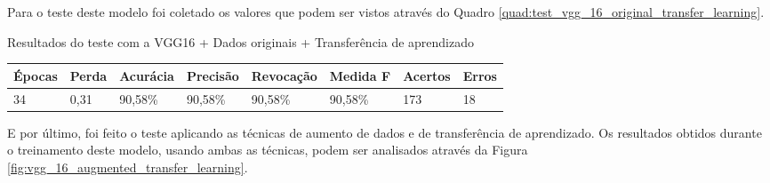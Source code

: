 \documentclass[
	12pt,				%
	oneside,			%
	a4paper,			%
	english,			%
	brazil				%
	]{abntex2ppgsi}
\begin{document}
Para o teste deste modelo foi coletado os valores que podem ser vistos através do Quadro \ref{quad:test_vgg_16_original_transfer_learning}.

\begin{quadro}[H]
\caption{Resultados do teste com a VGG16 + Dados originais + Transferência de aprendizado}
\label{quad:test_vgg_16_original_transfer_learning}
\centering
\begin{tabular}{|l|l|l|l|l|l|l|l|}
\cline{1-8}
Épocas & Perda & Acurácia & Precisão & Revocação & Medida F & Acertos & Erros \\ \hline
34 & 0,31 & 90,58\% & 90,58\% & 90,58\% & 90,58\% & 173 & 18 \\
\cline{1-8}
\end{tabular}
\end{quadro}

E por último, foi feito o teste aplicando as técnicas de aumento de dados e de transferência de aprendizado. Os resultados obtidos durante o treinamento deste modelo, usando ambas as técnicas, podem ser analisados através da Figura \ref{fig:vgg_16_augmented_transfer_learning}.
\end{document}
